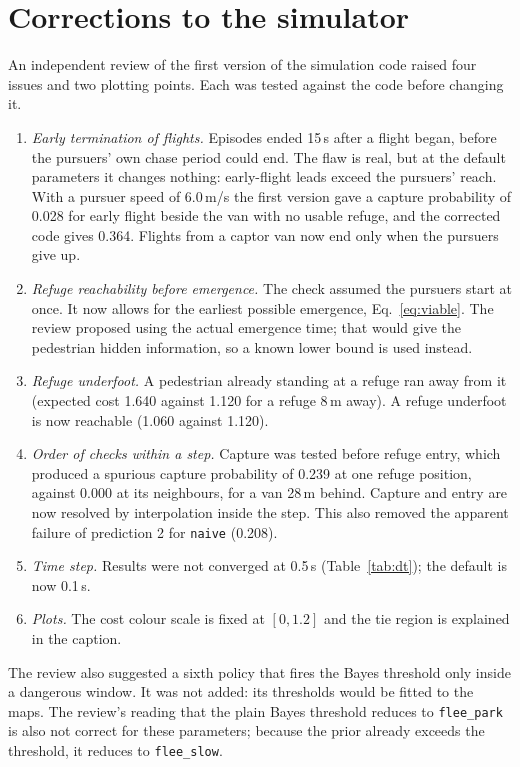 \documentclass[11pt,a4paper]{article}
\begin{document}
\section{Corrections to the simulator}\label{sec:fixes}
An independent review of the first version of the simulation code raised four issues and two plotting points. Each was tested against the code before changing it.
\begin{enumerate}
  \item \emph{Early termination of flights.} Episodes ended 15\,s after a flight began, before the pursuers' own chase period could end. The flaw is real, but at the default parameters it changes nothing: early-flight leads exceed the pursuers' reach. With a pursuer speed of 6.0\,m/s the first version gave a capture probability of 0.028 for early flight beside the van with no usable refuge, and the corrected code gives 0.364. Flights from a captor van now end only when the pursuers give up.
  \item \emph{Refuge reachability before emergence.} The check assumed the pursuers start at once. It now allows for the earliest possible emergence, Eq.~\eqref{eq:viable}. The review proposed using the actual emergence time; that would give the pedestrian hidden information, so a known lower bound is used instead.
  \item \emph{Refuge underfoot.} A pedestrian already standing at a refuge ran away from it (expected cost 1.640 against 1.120 for a refuge 8\,m away). A refuge underfoot is now reachable (1.060 against 1.120).
  \item \emph{Order of checks within a step.} Capture was tested before refuge entry, which produced a spurious capture probability of 0.239 at one refuge position, against 0.000 at its neighbours, for a van 28\,m behind. Capture and entry are now resolved by interpolation inside the step. This also removed the apparent failure of prediction 2 for \texttt{naive} (0.208).
  \item \emph{Time step.} Results were not converged at 0.5\,s (Table~\ref{tab:dt}); the default is now 0.1\,s.
  \item \emph{Plots.} The cost colour scale is fixed at $[0,1.2]$ and the tie region is explained in the caption.
\end{enumerate}
The review also suggested a sixth policy that fires the Bayes threshold only inside a dangerous window. It was not added: its thresholds would be fitted to the maps. The review's reading that the plain Bayes threshold reduces to \texttt{flee\_park} is also not correct for these parameters; because the prior already exceeds the threshold, it reduces to \texttt{flee\_slow}.
\end{document}
